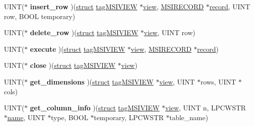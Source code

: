 \begin{DoxyCompactItemize}
U\+I\+NT($\ast$ {\bfseries insert\+\_\+row} )(\hyperlink{interfacestruct}{struct} \hyperlink{structtag_m_s_i_v_i_e_w}{tag\+M\+S\+I\+V\+I\+EW} $\ast$\hyperlink{structview}{view}, \hyperlink{structtag_m_s_i_r_e_c_o_r_d}{M\+S\+I\+R\+E\+C\+O\+RD} $\ast$\hyperlink{structrecord}{record}, U\+I\+NT row, B\+O\+OL temporary)
\item 
\mbox{\label{structtag_m_s_i_v_i_e_w_o_p_s_ae7505ce85ffd650d95ba410c12773d74}} 
U\+I\+NT($\ast$ {\bfseries delete\+\_\+row} )(\hyperlink{interfacestruct}{struct} \hyperlink{structtag_m_s_i_v_i_e_w}{tag\+M\+S\+I\+V\+I\+EW} $\ast$\hyperlink{structview}{view}, U\+I\+NT row)
\item 
\mbox{\label{structtag_m_s_i_v_i_e_w_o_p_s_ac30482a5b0d68b3f82ac220067138449}} 
U\+I\+NT($\ast$ {\bfseries execute} )(\hyperlink{interfacestruct}{struct} \hyperlink{structtag_m_s_i_v_i_e_w}{tag\+M\+S\+I\+V\+I\+EW} $\ast$\hyperlink{structview}{view}, \hyperlink{structtag_m_s_i_r_e_c_o_r_d}{M\+S\+I\+R\+E\+C\+O\+RD} $\ast$\hyperlink{structrecord}{record})
\item 
\mbox{\label{structtag_m_s_i_v_i_e_w_o_p_s_ab7d45316067b97147b60bf9fb76f4060}} 
U\+I\+NT($\ast$ {\bfseries close} )(\hyperlink{interfacestruct}{struct} \hyperlink{structtag_m_s_i_v_i_e_w}{tag\+M\+S\+I\+V\+I\+EW} $\ast$\hyperlink{structview}{view})
\item 
\mbox{\label{structtag_m_s_i_v_i_e_w_o_p_s_abeb265abc44d6a98e56ac645ab6286f5}} 
U\+I\+NT($\ast$ {\bfseries get\+\_\+dimensions} )(\hyperlink{interfacestruct}{struct} \hyperlink{structtag_m_s_i_v_i_e_w}{tag\+M\+S\+I\+V\+I\+EW} $\ast$\hyperlink{structview}{view}, U\+I\+NT $\ast$rows, U\+I\+NT $\ast$cols)
\item 
\mbox{\label{structtag_m_s_i_v_i_e_w_o_p_s_ad53e43ec6435a5f6b8ca5b5d4fe118fd}} 
U\+I\+NT($\ast$ {\bfseries get\+\_\+column\+\_\+info} )(\hyperlink{interfacestruct}{struct} \hyperlink{structtag_m_s_i_v_i_e_w}{tag\+M\+S\+I\+V\+I\+EW} $\ast$\hyperlink{structview}{view}, U\+I\+NT n, L\+P\+C\+W\+S\+TR $\ast$\hyperlink{structname}{name}, U\+I\+NT $\ast$type, B\+O\+OL $\ast$temporary, L\+P\+C\+W\+S\+TR $\ast$table\+\_\+name)
\item 
\mbox{\label{structtag_m_s_i_v_i_e_w_o_p_s_aae212e5725d8f2c194a35a3cf9c89d27}} 

\end{DoxyCompactItemize}
